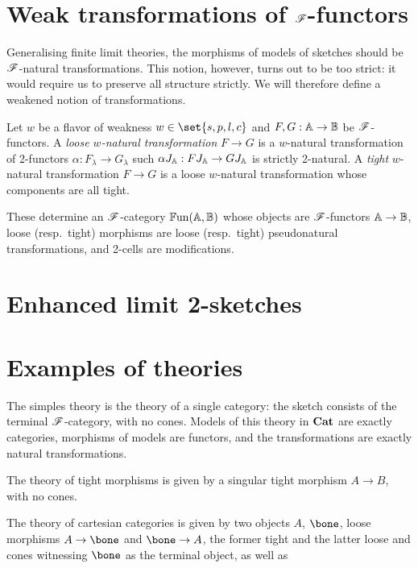 \documentclass[../thesis.tex]{subfiles}
\begin{document}
  \section{Weak transformations of \texorpdfstring{${\mathscr{F}}$}{F}-functors}
  \newcommand{\bFun}{{\mathbb{F}\mathrm{un}}}
  Generalising finite limit theories, the morphisms of models of sketches should be ${\mathscr{F}}$-natural
  transformations. This notion, however, turns out to be too strict: it would require us to
  preserve all structure strictly. We will therefore define a weakened notion of transformations.
  \begin{definition}
    Let $w$ be a flavor of weakness $w \in \set{s,p,l,c}$ and $F, G : {\mathbb{A}} \to {\mathbb{B}}$ be ${\mathscr{F}}$-%
    functors. A \emph{loose $w$-natural transformation} $F \to G$ is a $w$-natural transformation
    of 2-functors $\alpha : F_\lambda \to G_\lambda$ such $\alpha J_{\mathbb{A}} : F J_{\mathbb{A}} \to G J_{\mathbb{A}}$ is
    strictly 2-natural. A \emph{tight} $w$-natural transformation $F \to G$ is a loose $w$-natural
    transformation whose components are all tight.

    These determine an ${\mathscr{F}}$-category $\bFun(\bA,\bB)$ whose objects are ${\mathscr{F}}$-functors ${\mathbb{A}} \to
    {\mathbb{B}}$, loose (resp.\ tight) morphisms are loose (resp.\ tight) pseudonatural transformations,
    and 2-cells are modifications. 
  \end{definition}
  \begin{remark}
  \end{remark}

  \section{Enhanced limit 2-sketches}

  \section{Examples of theories}
  \begin{example}
    The simples theory is the theory of a single category: the sketch consists of the terminal
    ${\mathscr{F}}$-category, with no cones. Models of this theory in ${\mathbf{Cat}}$ are exactly categories,
    morphisms of models are functors, and the transformations are exactly natural transformations.
  \end{example}

  \begin{example}
    The theory of tight morphisms is given by a singular tight morphism $A \to B$, with no cones.
  \end{example}
  
  \begin{example}
    The theory of cartesian categories is given by two objects $A$, $\bone$, loose morphisms $A
    \to \bone$ and $\bone \to A$, the former tight and the latter loose and cones witnessing
    $\bone$ as the terminal object, as well as 
  \end{example}

  \ifSubfilesClassLoaded{\printbibliography}{}
\end{document}
